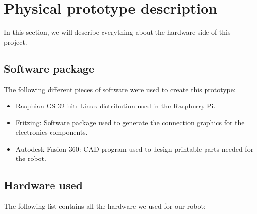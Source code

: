 
\section{Physical prototype description}
In this section, we will describe everything about the hardware side of this project.

\subsection{Software package}

The following different pieces of software were used to create this prototype:

\begin{itemize}
    \item Raspbian OS 32-bit\cite{raspbian}: Linux distribution used in the Raspberry Pi.
    \item Fritzing\cite{fritzing}: Software package used to generate the connection graphics for the electronics components.
    \item Autodesk Fusion 360\cite{fusion360}: CAD program used to design printable parts needed for the robot.
\end{itemize}


    

\subsection{Hardware used}

The following list contains all the hardware we used for our robot:

